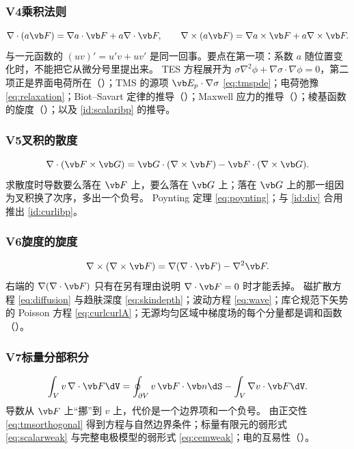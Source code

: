 \subsubsection{V4\quad 乘积法则}
\begin{equation*}
\nabla\cdot(a\vb F)=\nabla a\cdot\vb F+a\nabla\cdot\vb F,
\qquad
\nabla\times(a\vb F)=\nabla a\times\vb F+a\nabla\times\vb F .
\end{equation*}
与一元函数的 $(uv)'=u'v+uv'$ 是同一回事。要点在第一项：系数 $a$ 随位置变化时，不能把它从微分号里提出来。
{TES 方程展开为 $\sigma\nabla^2\phi+\nabla\sigma\cdot\nabla\phi=0$，第二项正是界面电荷所在（）；TMS 的源项 $\vb E_p\cdot\nabla\sigma$ \eqref{eq:tmspde}；电荷弛豫 \eqref{eq:relaxation}；Biot--Savart 定律的推导（）；Maxwell 应力的推导（）；棱基函数的旋度（）；以及 \eqref{id:scalaribp} 的推导。}

\subsubsection{V5\quad 叉积的散度}
\begin{equation*}
\nabla\cdot(\vb F\times\vb G)=\vb G\cdot(\nabla\times\vb F)-\vb F\cdot(\nabla\times\vb G) .
\end{equation*}
求散度时导数要么落在 $\vb F$ 上，要么落在 $\vb G$ 上；落在 $\vb G$ 上的那一组因为叉积换了次序，多出一个负号。
{Poynting 定理 \eqref{eq:poynting}；与 \eqref{id:div} 合用推出 \eqref{id:curlibp}。}

\subsubsection{V6\quad 旋度的旋度}
\begin{equation*}
\nabla\times(\nabla\times\vb F)=\nabla(\nabla\cdot\vb F)-\nabla^2\vb F .
\end{equation*}
右端的 $\nabla(\nabla\cdot\vb F)$ 只有在另有理由说明 $\nabla\cdot\vb F=0$ 时才能丢掉。
{磁扩散方程 \eqref{eq:diffusion} 与趋肤深度 \eqref{eq:skindepth}；波动方程 \eqref{eq:wave}；库仑规范下矢势的 Poisson 方程 \eqref{eq:curlcurlA}；无源均匀区域中梯度场的每个分量都是调和函数（）。}

\subsubsection{V7\quad 标量分部积分}
\begin{equation*}
\int_Vv\,\nabla\cdot\vb F\dV=\oint_{\partial V}v\,\vb F\cdot\vb n\dS-\int_V\nabla v\cdot\vb F\dV .
\end{equation*}
导数从 $\vb F$ 上“挪”到 $v$ 上，代价是一个边界项和一个负号。
{由正交性 \eqref{eq:tmsorthogonal} 得到方程与自然边界条件；标量有限元的弱形式 \eqref{eq:scalarweak} 与完整电极模型的弱形式 \eqref{eq:cemweak}；电的互易性（）。}

